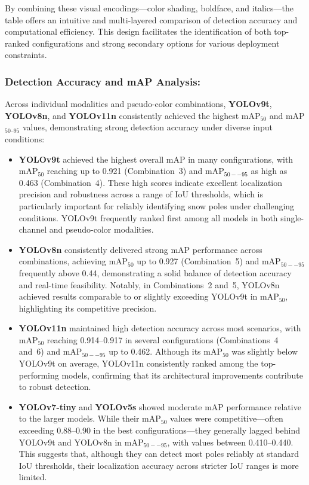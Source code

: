 \documentclass[runningheads]{llncs}
\begin{document}
By combining these visual encodings—color shading, boldface, and italics—the table offers an intuitive and multi-layered comparison of detection accuracy and computational efficiency. This design facilitates the identification of both top-ranked configurations and strong secondary options for various deployment constraints.

\subsubsection{Detection Accuracy and mAP Analysis:}


Across individual modalities and pseudo-color combinations, \textbf{YOLOv9t}, \textbf{YOLOv8n}, and \textbf{YOLOv11n} consistently achieved the highest mAP$_{50}$ and mAP$_{50\text{--}95}$ values, demonstrating strong detection accuracy under diverse input conditions:

\begin{itemize}
    \item \textbf{YOLOv9t} achieved the highest overall mAP in many configurations, with mAP$_{50}$ reaching up to 0.921 (Combination~3) and mAP$_{50--95}$ as high as 0.463 (Combination~4). These high scores indicate excellent localization precision and robustness across a range of IoU thresholds, which is particularly important for reliably identifying snow poles under challenging conditions. YOLOv9t frequently ranked first among all models in both single-channel and pseudo-color modalities.
    
    \item \textbf{YOLOv8n} consistently delivered strong mAP performance across combinations, achieving mAP$_{50}$ up to 0.927 (Combination~5) and mAP$_{50--95}$ frequently above 0.44, demonstrating a solid balance of detection accuracy and real-time feasibility. Notably, in Combinations~2 and~5, YOLOv8n achieved results comparable to or slightly exceeding YOLOv9t in mAP$_{50}$, highlighting its competitive precision.
    
    \item \textbf{YOLOv11n} maintained high detection accuracy across most scenarios, with mAP$_{50}$ reaching 0.914--0.917 in several configurations (Combinations~4 and~6) and mAP$_{50--95}$ up to 0.462. Although its mAP$_{50}$ was slightly below YOLOv9t on average, YOLOv11n consistently ranked among the top-performing models, confirming that its architectural improvements contribute to robust detection.
    
    \item \textbf{YOLOv7-tiny} and \textbf{YOLOv5s} showed moderate mAP performance relative to the larger models. While their mAP$_{50}$ values were competitive—often exceeding 0.88--0.90 in the best configurations—they generally lagged behind YOLOv9t and YOLOv8n in mAP$_{50--95}$, with values between 0.410--0.440. This suggests that, although they can detect most poles reliably at standard IoU thresholds, their localization accuracy across stricter IoU ranges is more limited.
\end{itemize}
\end{document}
